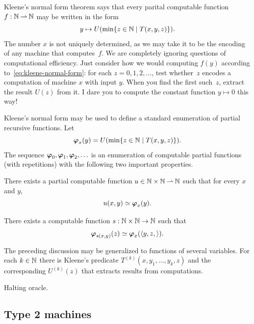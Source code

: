 Kleene's normal form theorem says that every parital computable
function $f : \mathbb{N} \mathbin{\rightharpoonup} \mathbb{N}$ may be written in the form
%
\begin{equation}
  \label{eq:kleene-normal-form}
  y \mapsto U(\min \{z \in \mathbb{N} \mid T(x,y,z)\}).
\end{equation}
%
The number $x$ is not uniquely determined, as we may take it to be the
encoding of any machine that computes~$f$. We are completely ignoring
questions of computational efficiency. Just consider how we would
computing $f(y)$ according to~\eqref{eq:kleene-normal-form}: for each
$z = 0, 1, 2, \ldots$, test whether~$z$ encodes a computation of
machine $x$ with input $y$. When you find the first such~$z$, extract
the result $U(z)$ from it. I dare you to compute the constant function
$y \mapsto 0$ this way!

Kleene's normal form may be used to define a standard enumeration of
partial recursive functions. Let
%
\begin{equation*}
  \text{\boldmath{$\varphi$}}_{x}(y) = U(\min \{z \in \mathbb{N} \mid T(x,y,z)\}).
\end{equation*}
%
The sequence $\text{\boldmath{$\varphi$}}_0, \text{\boldmath{$\varphi$}}_1, \text{\boldmath{$\varphi$}}_2, \ldots$ is an enumeration of
computable partial functions (with repetitions) with the following two
important properties.

\begin{theorem}[u-t-m]
  There exists a partial computable function $u \in \mathbb{N} \times \mathbb{N} \mathbin{\rightharpoonup}
  \mathbb{N}$ such that for every $x$ and $y$,
  \begin{equation*}
    u(x,y) \simeq \text{\boldmath{$\varphi$}}_{x}(y).
  \end{equation*}
\end{theorem}

\begin{theorem}[s-m-n]
  There exists a computable function $s : \mathbb{N} \times \mathbb{N} \to \mathbb{N}$ such
  that
  \begin{equation*}
    \text{\boldmath{$\varphi$}}_{s(x,y)}(z) \simeq \text{\boldmath{$\varphi$}}_{x}(\langle y, z, \rangle).
  \end{equation*}
\end{theorem}



The preceding discussion may be generalized to functions of several
variables. For each $k \in \mathbb{N}$ there is Kleene's predicate
$T^{(k)}(x,y_1,\ldots,y_k,z)$ and the corresponding $U^{(k)}(z)$ that
extracts results from computations.


Halting oracle.


\subsection{Type 2 machines}
\label{sec:type-2}

